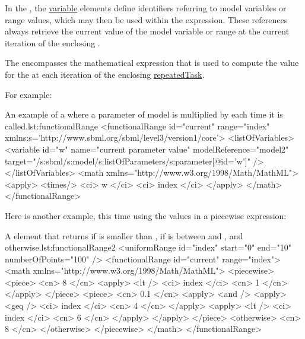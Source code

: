 In the \hyperref[sec:listOfVariables]{}, the \hyperref[class:variable]{variable} elements define identifiers referring to model variables or range values, which may then be used within the \hyperref[sec:math]{} expression. These references always retrieve the current value of the model variable or range at the current iteration of the enclosing .

The \hyperref[sec:math]{} encompasses the mathematical expression that is used to compute the value for the  at each iteration of the enclosing \hyperref[class:repeatedTask]{repeatedTask}.

For example:

\begin{myXmlLst}{An example of a  where a parameter  of model  is multiplied by  each time it is called.}{lst:functionalRange}
<functionalRange id="current" range="index"
	xmlns:s='http://www.sbml.org/sbml/level3/version1/core'>
	<listOfVariables>
		<variable id="w" name="current parameter value" modelReference="model2"
			target="/s:sbml/s:model/s:listOfParameters/s:parameter[@id='w']" />
	</listOfVariables>
	<math xmlns="http://www.w3.org/1998/Math/MathML">
	  <apply>
	    <times/>
		  <ci> w </ci>
          <ci> index </ci>
      </apply>
	</math>
</functionalRange>
\end{myXmlLst}

Here is another example, this time using the values in a piecewise expression: 

\begin{myXmlLst}{A  element that returns  if  is smaller than ,  if  is between  and , and  otherwise.}{lst:functionalRange2}
<uniformRange id="index" start="0" end="10" numberOfPoints="100" />
<functionalRange id="current" range="index">
	<math xmlns="http://www.w3.org/1998/Math/MathML">
		<piecewise>
			<piece>
				<cn> 8 </cn>
				<apply>
					<lt />
					<ci> index </ci>
					<cn> 1 </cn>
				</apply>
			</piece>
			<piece>
				<cn> 0.1 </cn>
				<apply>
					<and />
					<apply>
						<geq />
                    	<ci> index </ci>
                    	<cn> 4 </cn>
					</apply>
					<apply>
						<lt />
						<ci> index </ci>
						<cn> 6 </cn>
					</apply>
				</apply>
			</piece>
			<otherwise>
				<cn> 8 </cn>
			</otherwise>
		</piecewise>
	</math>
</functionalRange>
\end{myXmlLst}
